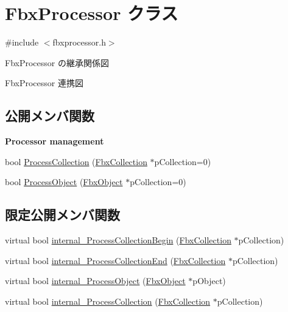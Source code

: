 \hypertarget{class_fbx_processor}{}\section{Fbx\+Processor クラス}
\label{class_fbx_processor}


{\ttfamily \#include $<$fbxprocessor.\+h$>$}



Fbx\+Processor の継承関係図


Fbx\+Processor 連携図
\subsection*{公開メンバ関数}
\begin{Indent}\textbf{ Processor management}\par
\begin{DoxyCompactItemize}
\item 
bool \hyperlink{class_fbx_processor_acb7f2a7c80e823b16d2639d7293fefb3}{Process\+Collection} (\hyperlink{class_fbx_collection}{Fbx\+Collection} $\ast$p\+Collection=0)
\item 
bool \hyperlink{class_fbx_processor_adb5587b39465b31d968f1ba7dd2b2d5f}{Process\+Object} (\hyperlink{class_fbx_object}{Fbx\+Object} $\ast$p\+Collection=0)
\end{DoxyCompactItemize}
\end{Indent}
\subsection*{限定公開メンバ関数}
\begin{DoxyCompactItemize}
\item 
virtual bool \hyperlink{class_fbx_processor_aae65d06b0e0f7865eaaa803a4009d536}{internal\+\_\+\+Process\+Collection\+Begin} (\hyperlink{class_fbx_collection}{Fbx\+Collection} $\ast$p\+Collection)
\item 
virtual bool \hyperlink{class_fbx_processor_ae578a3b99db2133b967b0ed29ce37e96}{internal\+\_\+\+Process\+Collection\+End} (\hyperlink{class_fbx_collection}{Fbx\+Collection} $\ast$p\+Collection)
\item 
virtual bool \hyperlink{class_fbx_processor_ac549e7e8c678383831be8789a7c4ccdb}{internal\+\_\+\+Process\+Object} (\hyperlink{class_fbx_object}{Fbx\+Object} $\ast$p\+Object)
\item 
virtual bool \hyperlink{class_fbx_processor_a0b0b24fc89c90b8cc6149df1360fbcbd}{internal\+\_\+\+Process\+Collection} (\hyperlink{class_fbx_collection}{Fbx\+Collection} $\ast$p\+Collection)
\end{DoxyCompactItemize}

